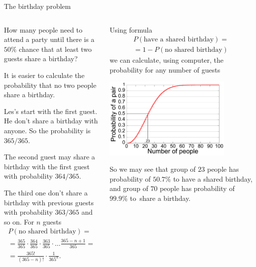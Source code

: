 \documentclass[9pt,aspectratio=169]{beamer}
\begin{document}
\begin{frame}{The birthday problem}
  \begin{columns}[T]
    \begin{column}{0.5\textwidth}
      \begin{problem}
        How many people need to attend a party until there is a $50\%$ chance that at least two guests share a birthday?
      \end{problem}
      It is easier to calculate the probability that no two people share a birthday. 
      
      Les's start with the first guest. He don't share a birthday with anyone. So the probability is $365/365$.
      
      The second guest may share a birthday with the first guest with probability $364/365$. 
      
      The third one don't share a birthday with previous guests with probability $363/365$ and so on. For $n$ guests
      \begin{multline*}
        P(\text{no shared birthday}) = \\
        = \frac{365}{365} \cdot \frac{364}{365} \cdot \frac{363}{365} \cdot \ldots \frac{365 - n + 1}{365} = \\ = \frac{365!}{(365-n)!} \cdot \frac{1}{365^n}.
      \end{multline*}
    \end{column}
    \begin{column}{0.5\textwidth}
      Using formula 
      \begin{multline*}
         P(\text{have a shared birthday}) = \\ 
         = 1 - P(\text{no shared birthday})
      \end{multline*}
      we can calculate, using computer, the probability for any number of guests
      \begin{center}
        \includegraphics[width = 0.80\textwidth]{03 - Probability/Birthday_Paradox.pdf}
        \vspace*{-1ex}   
      \end{center} 
      So we may see that group of $23$ people has probability of $50.7\%$ to have a shared birthday, and group of $70$ people has probability of $99.9\%$ to~share a birthday.
    \end{column}
  \end{columns}
\end{frame}
\end{document}
